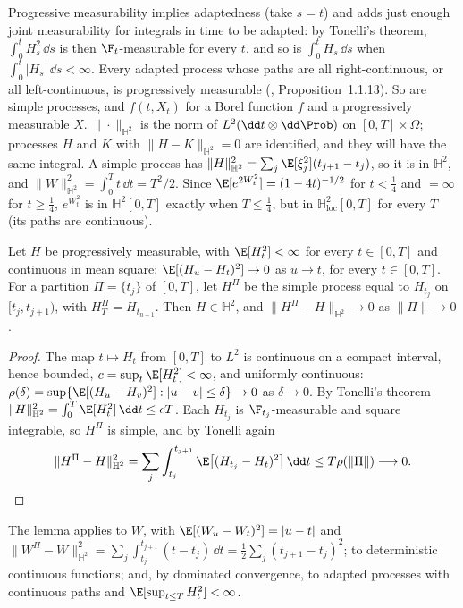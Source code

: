 Progressive measurability implies adaptedness (take $s=t$) and adds just enough joint
measurability for integrals in time to be adapted: by Tonelli's theorem, $\int_0^tH_s^2\,\dd s$ is then
$\F_t$-measurable for every $t$, and so is $\int_0^tH_s\,\dd s$ when $\int_0^t|H_s|\,\dd s<\infty$.
Every adapted process whose paths are all right-continuous, or all left-continuous, is
progressively measurable (\textcite{karatzas-shreve}, Proposition~1.1.13). So are simple
processes, and $f(t,X_t)$ for a Borel function $f$ and a progressively measurable $X$.
$\|\cdot\|_{\mathbb H^2}$ is the norm of $L^2(\dd t\otimes\dd\Prob)$ on $[0,T]\times\Omega$;
processes $H$ and $K$ with $\|H-K\|_{\mathbb H^2}=0$ are identified, and they will have the
same integral. A simple process has $\|H\|_{\mathbb H^2}^2=\sum_j\E[\xi_j^2](t_{j+1}-t_j)$, so
it is in $\mathbb H^2$, and $\|W\|_{\mathbb H^2}^2=\int_0^Tt\,\dd t=T^2/2$. Since
$\E[e^{2W_t^2}]=(1-4t)^{-1/2}$ for $t<\frac14$ and $=\infty$ for $t\ge\frac14$, $e^{W_t^2}$ is in
$\mathbb H^2[0,T]$ exactly when $T\le\frac14$, but in $\mathbb H^2_{\mathrm{loc}}[0,T]$ for
every $T$ (its paths are continuous).

\begin{lemma}\label{lem:ito-riemann}
Let $H$ be progressively measurable, with $\E[H_t^2]<\infty$ for every $t\in[0,T]$ and
continuous in mean square: $\E[(H_u-H_t)^2]\to0$ as $u\to t$, for every $t\in[0,T]$. For a
partition $\Pi=\{t_j\}$ of $[0,T]$, let $H^\Pi$ be the simple process equal to $H_{t_j}$ on
$[t_j,t_{j+1})$, with $H^\Pi_T=H_{t_{n-1}}$. Then $H\in\mathbb H^2$, and
$\|H^\Pi-H\|_{\mathbb H^2}\to0$ as $\|\Pi\|\to0$.
\end{lemma}

\begin{proof}
The map $t\mapsto H_t$ from $[0,T]$ to $L^2$ is continuous on a compact interval, hence
bounded, $c=\sup_t\E[H_t^2]<\infty$, and uniformly continuous:
$\rho(\delta)=\sup\{\E[(H_u-H_v)^2]:|u-v|\le\delta\}\to0$ as $\delta\to0$. By Tonelli's
theorem $\|H\|_{\mathbb H^2}^2=\int_0^T\E[H_t^2]\,\dd t\le cT$. Each $H_{t_j}$ is
$\F_{t_j}$-measurable and square integrable, so $H^\Pi$ is simple, and by Tonelli again
\[
  \|H^\Pi-H\|_{\mathbb H^2}^2=\sum_j\int_{t_j}^{t_{j+1}}\E\big[(H_{t_j}-H_t)^2\big]\,\dd t\le
  T\rho(\|\Pi\|)\longrightarrow0 .\qedhere
\]
\end{proof}

The lemma applies to $W$, with $\E[(W_u-W_t)^2]=|u-t|$ and
$\|W^\Pi-W\|_{\mathbb H^2}^2=\sum_j\int_{t_j}^{t_{j+1}}(t-t_j)\,\dd t=\frac12\sum_j(t_{j+1}-t_j)^2$;
to deterministic continuous functions; and, by dominated convergence, to adapted processes
with continuous paths and $\E[\sup_{t\le T}H_t^2]<\infty$.

